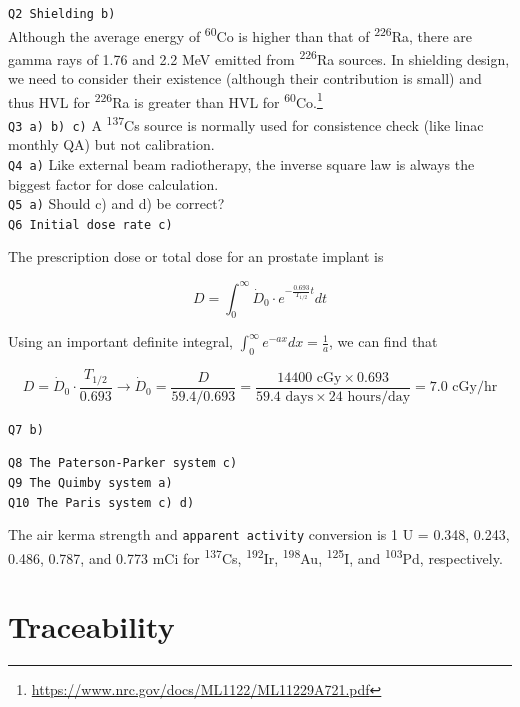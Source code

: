 \documentclass[]{book}
\let\rmarkdownfootnote\footnote%
\def\footnote{\protect\rmarkdownfootnote}
\theoremstyle{definition}
\theoremstyle{definition}
\theoremstyle{definition}
\theoremstyle{remark}
\begin{document}
\texttt{Q2\ Shielding\ b)}\\
Although the average energy of \textsuperscript{60}Co is higher than
that of \textsuperscript{226}Ra, there are gamma rays of 1.76 and 2.2
MeV emitted from \textsuperscript{226}Ra sources. In shielding design,
we need to consider their existence (although their contribution is
small) and thus HVL for \textsuperscript{226}Ra is greater than HVL for
\textsuperscript{60}Co.\footnote{\url{https://www.nrc.gov/docs/ML1122/ML11229A721.pdf}}\\
\texttt{Q3\ a)\ b)\ c)} A \textsuperscript{137}Cs source is normally
used for consistence check (like linac monthly QA) but not
calibration.\\
\texttt{Q4\ a)} Like external beam radiotherapy, the inverse square law
is always the biggest factor for dose calculation.\\
\texttt{Q5\ a)} Should c) and d) be correct?\\
\texttt{Q6\ Initial\ dose\ rate\ c)}

The prescription dose or total dose for an prostate implant is

\begin{equation*}
D = \int^{\infty}_0 \dot D_0 \cdot e^{-\frac{0.693}{T_{1/2}}t}dt
\end{equation*}

Using an important definite integral,
\(\int^{\infty}_0 e^{-ax} dx = \frac{1}{a}\), we can find that

\begin{equation*}
D = \dot D_0 \cdot \frac{T_{1/2}}{0.693} \rightarrow \dot D_0 = \frac{D}{59.4/0.693}=\frac{14400 \text{ cGy} \times 0.693}{59.4 \text{ days} \times 24 \text{ hours/day}} = \boxed{7.0\text{ cGy/hr}}
\end{equation*}

\texttt{Q7\ b)}

\texttt{Q8\ The\ Paterson-Parker\ system\ c)}\\
\texttt{Q9\ The\ Quimby\ system\ a)}\\
\texttt{Q10\ The\ Paris\ system\ c)\ d)}

The air kerma strength and \texttt{apparent\ activity} conversion is 1 U
= 0.348, 0.243, 0.486, 0.787, and 0.773 mCi for \textsuperscript{137}Cs,
\textsuperscript{192}Ir, \textsuperscript{198}Au,
\textsuperscript{125}I, and \textsuperscript{103}Pd, respectively.

\section{Traceability}\label{traceability}
\end{document}
